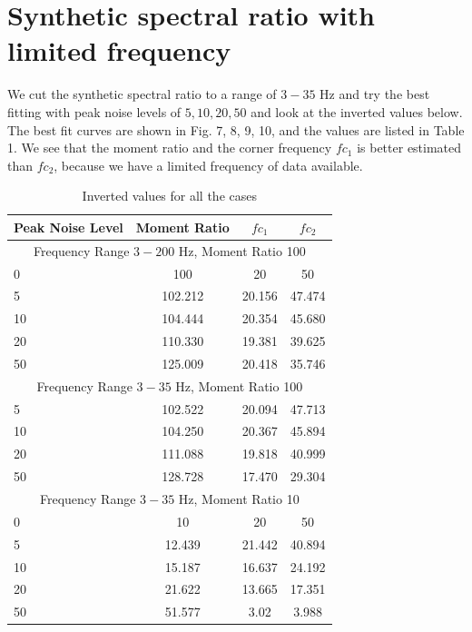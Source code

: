 \documentclass[11pt]{article}
\begin{document}
\section*{Synthetic spectral ratio with limited frequency}
We cut the synthetic spectral ratio to a range of $3-35$ Hz and try the best fitting with peak noise levels of $5, 10, 20, 50$ and look at the inverted values below. The best fit curves are shown in Fig. 7, 8, 9, 10, and the values are listed in Table 1. We see that the moment ratio and the corner frequency $fc_1$ is better estimated than $fc_2$, because we have a limited frequency of data available.
\begin{center}
\begin{table}
    \begin{tabular}{l c c c}
        \toprule%
        Peak Noise Level & Moment Ratio & $fc_1$ & $fc_2$ \\
        \midrule
        \multicolumn{4}{c}{Frequency Range $3-200$ Hz, Moment Ratio 100}\\
        \midrule
        0 & 100 & 20 & 50 \\
        5 & 102.212 & 20.156 & 47.474 \\
        10 & 104.444 & 20.354 & 45.680\\
        20 & 110.330 & 19.381 & 39.625\\
        50 & 125.009 & 20.418 & 35.746\\
        \midrule
        \multicolumn{4}{c}{Frequency Range $3-35$ Hz, Moment Ratio 100}\\
        \midrule
        5 & 102.522 & 20.094 & 47.713 \\
        10 & 104.250 & 20.367 & 45.894\\
        20 & 111.088 & 19.818 & 40.999\\
        50 & 128.728 & 17.470 & 29.304\\
        \midrule
        \multicolumn{4}{c}{Frequency Range $3-35$ Hz, Moment Ratio 10}\\
        \midrule
        0 & 10 & 20 & 50 \\
        5 & 12.439 & 21.442 & 40.894 \\
        10 & 15.187 & 16.637 & 24.192\\
        20 & 21.622 & 13.665 & 17.351\\
        50 & 51.577 & 3.02 & 3.988\\
        \bottomrule
    \end{tabular}
    \caption{Inverted values for all the cases}
\end{table}
\end{center}
\end{document}
